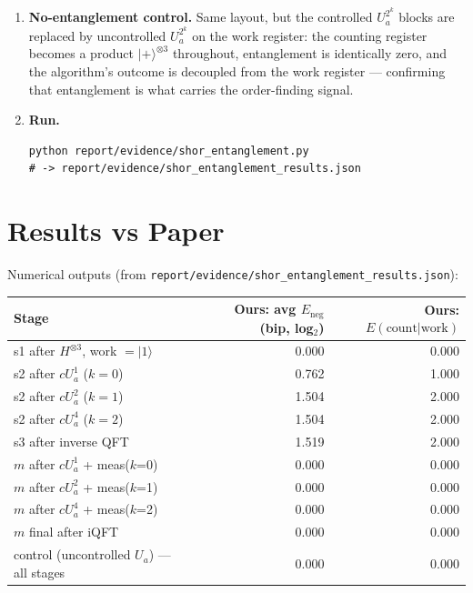 \documentclass[11pt]{article}
\begin{document}
\begin{enumerate}
\item \textbf{No-entanglement control.}
  Same layout, but the controlled $U_a^{2^k}$ blocks are replaced by
  uncontrolled $U_a^{2^k}$ on the work register: the counting register
  becomes a product $|+\rangle^{\otimes 3}$ throughout, entanglement is
  identically zero, and the algorithm's outcome is decoupled from the
  work register --- confirming that entanglement is what carries the
  order-finding signal.

\item \textbf{Run.}
  \begin{lstlisting}
python report/evidence/shor_entanglement.py
# -> report/evidence/shor_entanglement_results.json
  \end{lstlisting}
\end{enumerate}

\section{Results vs Paper}

Numerical outputs (from
\texttt{report/evidence/shor\_entanglement\_results.json}):

\begin{center}
\begin{tabular}{lrr}
\toprule
Stage & Ours: avg $E_{\mathrm{neg}}$ (bip, log$_2$) & Ours: $E(\text{count}|\text{work})$ \\
\midrule
s1 after $H^{\otimes 3}$, work $=|1\rangle$   & 0.000 & 0.000 \\
s2 after $cU_a^{1}$ ($k=0$)                    & 0.762 & 1.000 \\
s2 after $cU_a^{2}$ ($k=1$)                    & 1.504 & 2.000 \\
s2 after $cU_a^{4}$ ($k=2$)                    & 1.504 & 2.000 \\
s3 after inverse QFT                           & 1.519 & 2.000 \\
\midrule
$m$ after $cU_a^{1}$ + meas($k$=0)             & 0.000 & 0.000 \\
$m$ after $cU_a^{2}$ + meas($k$=1)             & 0.000 & 0.000 \\
$m$ after $cU_a^{4}$ + meas($k$=2)             & 0.000 & 0.000 \\
$m$ final after iQFT                            & 0.000 & 0.000 \\
\midrule
control (uncontrolled $U_a$) --- all stages    & 0.000 & 0.000 \\
\bottomrule
\end{tabular}
\end{center}
\end{document}
